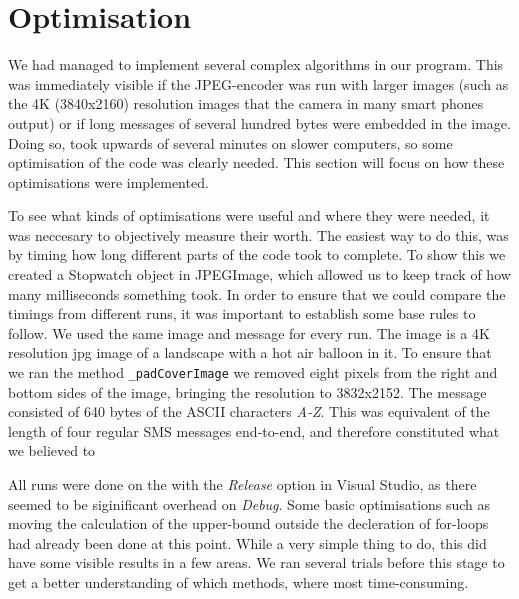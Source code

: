 \section{Optimisation}
We had managed to implement several complex algorithms in our program.
This was immediately visible if the JPEG-encoder was run with larger images (such as the 4K (3840x2160) resolution images that the camera in many smart phones output) or if long messages of several hundred bytes were embedded in the image.
Doing so, took upwards of several minutes on slower computers, so some optimisation of the code was clearly needed.
This section will focus on how these optimisations were implemented.
\vspace*{12pt}

To see what kinds of optimisations were useful and where they were needed, it was neccesary to objectively measure their worth.
The easiest way to do this, was by timing how long different parts of the code took to complete.
To show this we created a Stopwatch object in JPEGImage, which allowed us to keep track of how many milliseconds something took.
In order to ensure that we could compare the timings from different runs, it was important to establish some base rules to follow.
We used the same image and message for every run.
The image is a 4K resolution jpg image of a landscape with a hot air balloon in it.
To ensure that we ran the method \lstinline|_padCoverImage| we removed eight pixels from the right and bottom sides of the image, bringing the resolution to 3832x2152.
The message consisted of 640 bytes of the ASCII characters \textit{A-Z}.
This was equivalent of the length of four regular SMS messages end-to-end, and therefore constituted what we believed to

All runs were done on the with the \textit{Release} option in Visual Studio, as there seemed to be siginificant overhead on \textit{Debug}.
Some basic optimisations such as moving the calculation of the upper-bound outside the decleration of for-loops had already been done at this point.
While a very simple thing to do, this did have some visible results in a few areas.
We ran several trials before this stage to get a better understanding of which methods, where most time-consuming.

